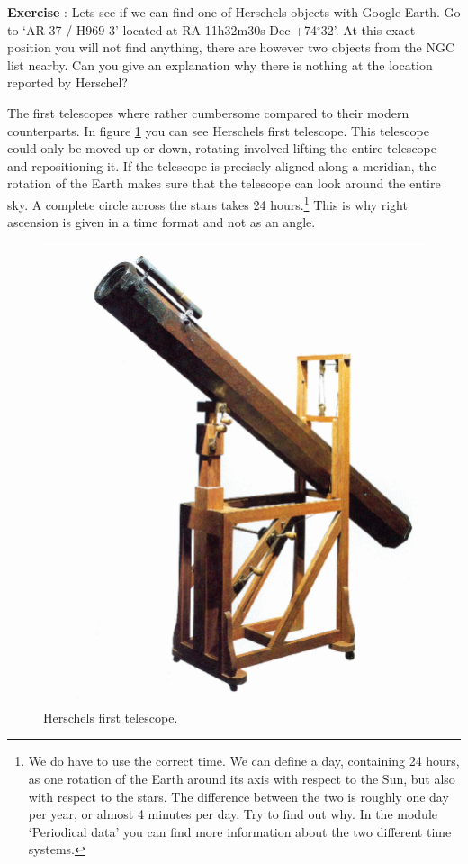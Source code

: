 \documentclass[12pt,a4paper]{article}
\numberwithin{equation}{section}
\numberwithin{figure}{section}
\newcounter{Exercise}
\numberwithin{table}{section}
\begin{document}
\begin{shaded}
\textbf{Exercise \theExercise {}} : Lets see if we can find one of Herschels objects with Google-Earth. Go to `AR 37 / H969-3' located at RA 11h32m30s Dec +74$^{\circ}$32'. At this exact position you will not find anything, there are however two objects from the NGC list nearby. Can you give an explanation why there is nothing at the location reported by Herschel?\end{shaded}

The first telescopes where rather cumbersome compared to their modern counterparts. In figure \ref{fig:tel_oud} you can see Herschels first telescope. This telescope could only be moved up or down, rotating  involved lifting the entire telescope and repositioning it. If the telescope is precisely aligned along a meridian, the rotation of the Earth makes sure that the telescope can look around the entire sky. A complete circle across the stars takes 24 hours.\footnote{We do have to use the correct time. We can define a day, containing 24 hours, as one rotation of the Earth around its axis with respect to the Sun, but also with respect to the stars. The difference between the two is roughly one day per year, or almost 4 minutes per day. Try to find out why. In the module `Periodical data' you can find more information about the two different time systems.} This is why right ascension is given in a time format and not as an angle. 
\begin{figure}\begin{center}
\includegraphics[scale=0.48]{tel_oud.eps}
\caption{Herschels first telescope.}\label{fig:tel_oud}
\end{center}\end{figure} 
\end{document}
